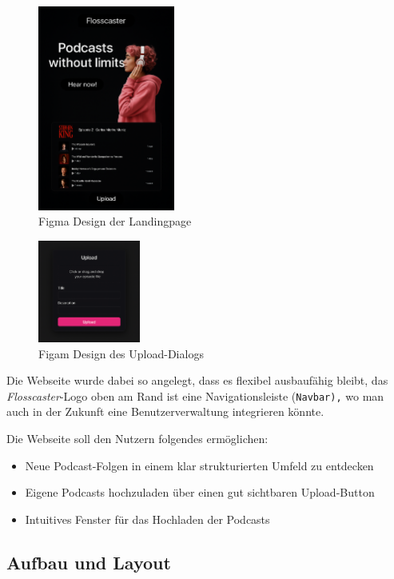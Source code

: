 \documentclass{article}
\begin{document}
\begin{figure}[h]
  \caption{Figma Design der Landingpage}
  \centering
  \includegraphics[width=0.4\textwidth]{flosscaster1.png}
\end{figure}

\begin{figure}[h]
  \caption{Figam Design des Upload-Dialogs}
  \centering
  \includegraphics[width=0.3\textwidth]{flosscaster2.png}
\end{figure}

Die Webseite wurde dabei so angelegt, dass es flexibel ausbaufähig bleibt, das \textit{Flosscaster}-Logo oben am Rand ist eine Navigationsleiste (\texttt{Navbar),} wo man auch in der Zukunft eine Benutzerverwaltung integrieren könnte.

Die Webseite soll den Nutzern folgendes ermöglichen:

\begin{itemize}
  \item Neue Podcast-Folgen in einem klar strukturierten Umfeld zu entdecken
  \item Eigene Podcasts hochzuladen über einen gut sichtbaren Upload-Button
  \item Intuitives Fenster für das Hochladen der Podcasts
\end{itemize}

\subsection{Aufbau und Layout}
\end{document}
